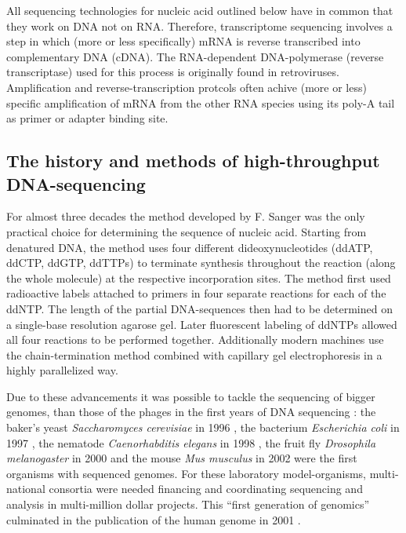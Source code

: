All sequencing technologies for nucleic acid outlined below have in
common that they work on DNA not on RNA. Therefore, transcriptome
sequencing involves a step in which (more or less specifically) mRNA
is reverse transcribed into complementary DNA (cDNA). The
RNA-dependent DNA-polymerase (reverse transcriptase) used for this
process is originally found in retroviruses. Amplification and
reverse-transcription protcols often achive (more or less) specific
amplification of mRNA from the other RNA species using its poly-A tail
as primer or adapter binding site.

\subsection{The history and methods of high-throughput DNA-sequencing}
\label{his-seq}

For almost three decades the method developed by F. Sanger
\cite{pmid271968} was the only practical choice for determining the
sequence of nucleic acid. Starting from denatured DNA, the method uses
four different dideoxynucleotides (ddATP, ddCTP, ddGTP, ddTTPs) to
terminate synthesis throughout the reaction (along the whole molecule)
at the respective incorporation sites. The method first used
radioactive labels attached to primers in four separate reactions for
each of the ddNTP. The length of the partial DNA-sequences then had to
be determined on a single-base resolution agarose gel. Later
fluorescent labeling of ddNTPs allowed all four reactions to be
performed together. Additionally modern machines use the
chain-termination method combined with capillary gel electrophoresis
\cite{pmid2326186} in a highly parallelized way.

Due to these advancements it was possible to tackle the sequencing of
bigger genomes, than those of the phages in the first years of DNA
sequencing \cite{pmid1264203}: the baker's yeast \textit{Saccharomyces
  cerevisiae} in 1996 \cite{pmid8849441}, the bacterium
\textit{Escherichia coli} in 1997 \cite{pmid9278503}, the nematode
\textit{Caenorhabditis elegans} in 1998 \cite{pmid9851916}, the fruit
fly \textit{Drosophila melanogaster} in 2000 \cite{adams2000genome}
and the mouse \textit{Mus musculus} in 2002 \cite{pmid12466850} were
the first organisms with sequenced genomes. For these laboratory
model-organisms, multi-national consortia were needed financing and
coordinating sequencing and analysis in multi-million dollar
projects. This ``first generation of genomics'' culminated in the
publication of the human genome in 2001 \cite{pmid11181995}.

